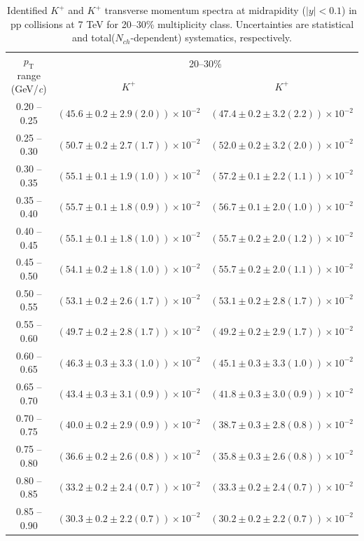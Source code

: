 \begin{table}
\caption{Identified $K^{+}$ and $K^{+}$  transverse momentum spectra at midrapidity ($|y|<0.1$) in pp collisions at 7 TeV for 20--30\% multiplicity class. Uncertainties are statistical and total($N_{ch}$-dependent) systematics, respectively.}
\label{tab:KaonPlus_KaonMinus_20to30}
\begin{center}
\begin{tabular}{ c | c c }
\hline
\multirow{2}{*}{$p_{\mathrm{T}}$ range (GeV/\textit{c})} & \multicolumn{2}{c}{20--30\%} \\ & $K^{+}$& $K^{+}$\\ 
\hline
0.20 -- 0.25 & $(45.6\pm0.2\pm2.9(2.0))\times10^{-2}$ & $(47.4\pm0.2\pm3.2(2.2))\times10^{-2}$ \\ 
0.25 -- 0.30 & $(50.7\pm0.2\pm2.7(1.7))\times10^{-2}$ & $(52.0\pm0.2\pm3.2(2.0))\times10^{-2}$ \\ 
0.30 -- 0.35 & $(55.1\pm0.1\pm1.9(1.0))\times10^{-2}$ & $(57.2\pm0.1\pm2.2(1.1))\times10^{-2}$ \\ 
0.35 -- 0.40 & $(55.7\pm0.1\pm1.8(0.9))\times10^{-2}$ & $(56.7\pm0.1\pm2.0(1.0))\times10^{-2}$ \\ 
0.40 -- 0.45 & $(55.1\pm0.1\pm1.8(1.0))\times10^{-2}$ & $(55.7\pm0.2\pm2.0(1.2))\times10^{-2}$ \\ 
0.45 -- 0.50 & $(54.1\pm0.2\pm1.8(1.0))\times10^{-2}$ & $(55.7\pm0.2\pm2.0(1.1))\times10^{-2}$ \\ 
0.50 -- 0.55 & $(53.1\pm0.2\pm2.6(1.7))\times10^{-2}$ & $(53.1\pm0.2\pm2.8(1.7))\times10^{-2}$ \\ 
0.55 -- 0.60 & $(49.7\pm0.2\pm2.8(1.7))\times10^{-2}$ & $(49.2\pm0.2\pm2.9(1.7))\times10^{-2}$ \\ 
0.60 -- 0.65 & $(46.3\pm0.3\pm3.3(1.0))\times10^{-2}$ & $(45.1\pm0.3\pm3.3(1.0))\times10^{-2}$ \\ 
0.65 -- 0.70 & $(43.4\pm0.3\pm3.1(0.9))\times10^{-2}$ & $(41.8\pm0.3\pm3.0(0.9))\times10^{-2}$ \\ 
0.70 -- 0.75 & $(40.0\pm0.2\pm2.9(0.9))\times10^{-2}$ & $(38.7\pm0.3\pm2.8(0.8))\times10^{-2}$ \\ 
0.75 -- 0.80 & $(36.6\pm0.2\pm2.6(0.8))\times10^{-2}$ & $(35.8\pm0.3\pm2.6(0.8))\times10^{-2}$ \\ 
0.80 -- 0.85 & $(33.2\pm0.2\pm2.4(0.7))\times10^{-2}$ & $(33.3\pm0.2\pm2.4(0.7))\times10^{-2}$ \\ 
0.85 -- 0.90 & $(30.3\pm0.2\pm2.2(0.7))\times10^{-2}$ & $(30.2\pm0.2\pm2.2(0.7))\times10^{-2}$ \\ 

\end{tabular}
\end{center}
\end{table}
